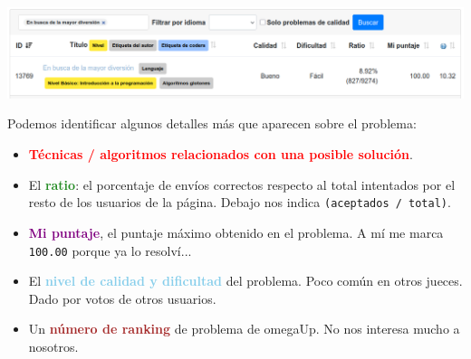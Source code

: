 \documentclass{beamer}
\begin{document}
    \begin{frame}[noframenumbering]
        \begin{center}
            \includegraphics[width=\linewidth]{./res/ou_searched.png}
        \end{center} \pause
        \vspace{-18pt}

        Podemos identificar algunos detalles más que aparecen sobre el problema: \pause

        \begin{itemize}
            \item<3-> \textcolor{red}{\textbf{Técnicas / algoritmos relacionados con una posible solución}}.


            \item<5->El \textcolor{ForestGreen}{\textbf{ratio}}: el porcentaje de envíos correctos respecto al total intentados por el resto de los usuarios de la página. Debajo nos indica \texttt{(aceptados / total)}.
            
            \item<6->\textbf{\textcolor{Purple}{Mi puntaje}}, el puntaje máximo obtenido en el problema. A mí me marca \texttt{100.00} porque ya lo resolví...

            \item<7->El \textbf{\textcolor{SkyBlue}{nivel de calidad y dificultad}} del problema. Poco común en otros jueces. Dado por votos de otros usuarios.

            \item<8->Un \textbf{\textcolor{Brown}{número de ranking}} de problema de omegaUp. No nos interesa mucho a nosotros.
        \end{itemize}
    \end{frame}
\end{document}
